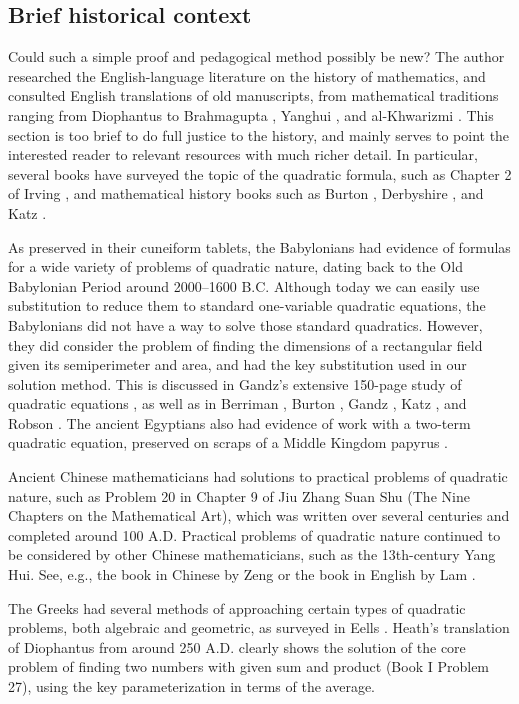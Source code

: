 \documentclass[11pt]{article}
\begin{document}
\subsection{Brief historical context}
\label{sec:history}

Could such a simple proof and pedagogical method possibly be new? The author
researched the English-language literature on the history of mathematics, and
consulted English translations of old manuscripts, from mathematical traditions
ranging from Diophantus \cite{diophantus} to Brahmagupta \cite{brahmagupta},
Yanghui \cite{yanghui}, and al-Khwarizmi \cite{al-khwarizmi}. This section is
too brief to do full justice to the history, and mainly serves to point the
interested reader to relevant resources with much richer detail. In particular,
several books have surveyed the topic of the quadratic formula, such as Chapter
2 of Irving \cite{irving}, and mathematical history books such as Burton
\cite{burton}, Derbyshire \cite{derbyshire}, and Katz \cite{katz}.

As preserved in their cuneiform tablets, the Babylonians had evidence of
formulas for a wide variety of problems of quadratic nature, dating back to the
Old Babylonian Period around 2000--1600 B.C. Although today we can easily use
substitution to reduce them to standard one-variable quadratic equations, the
Babylonians did not have a way to solve those standard quadratics.  However,
they did consider the problem of finding the dimensions of a rectangular field
given its semiperimeter and area, and had the key substitution used in our
solution method. This is discussed in Gandz's extensive 150-page study of
quadratic equations \cite{gandz-1937}, as well as in Berriman \cite{berriman},
Burton \cite{burton}, Gandz \cite{gandz-1940}, Katz \cite{katz}, and Robson
\cite{robson}.  The ancient Egyptians also had evidence of work with a two-term
quadratic equation, preserved on scraps of a Middle Kingdom papyrus
\cite{edwards-mideast}.

Ancient Chinese mathematicians had solutions to practical problems of
quadratic nature, such as Problem 20 in Chapter 9 of Jiu Zhang Suan Shu
(The Nine Chapters on the Mathematical Art), which was written over several
centuries and completed around 100 A.D. Practical problems of quadratic
nature continued to be considered by other Chinese mathematicians, such as
the 13th-century Yang Hui. See, e.g., the book in Chinese by Zeng
\cite{zeng} or the book in English by Lam \cite{lam}.

The Greeks had several methods of approaching certain types of quadratic
problems, both algebraic and geometric, as surveyed in Eells \cite{eells}.
Heath's translation \cite{heath} of Diophantus \cite{diophantus} from
around 250 A.D. clearly shows the solution of the core problem of finding
two numbers with given sum and product (Book I Problem 27), using the key
parameterization in terms of the average.
\end{document}
